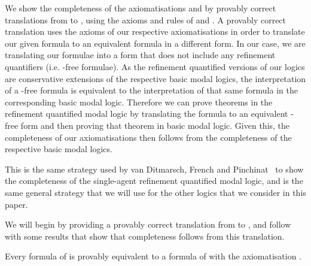 We show the completeness of the axiomatisations \axiomSiF{} and \axiomKDiF{} by
provably correct translations from \langFi{} to \langi{}, using the axioms and
rules of \axiomSiF{} and \axiomKDiF{}. A provably correct translation uses the
axioms of our respective axiomatisations in order to translate our given formula
to an equivalent formula in a different form. In our case, we are translating
our formulae into a form that does not include any refinement quantifiers (i.e.
\somerefs{}-free formulae). As the refinement quantified versions of our logics
are conservative extensions of the respective basic modal logics, the
interpretation of a \somerefs{}-free formula is equivalent to the interpretation
of that same formula in the corresponding basic modal logic. Therefore we can
prove theorems in the refinement quantified modal logic by translating the
formula to an equivalent \somerefs{}-free form and then proving that theorem in
basic modal logic. Given this, the completeness of our axiomatisations then
follows from the completeness of the respective basic modal logics.

This is the same strategy used by van Ditmarsch, French and
Pinchinat~\cite{french2010future} to show the completeness of the single-agent
refinement quantified modal logic, and is the same general strategy that we will
use for the other logics that we consider in this paper. 

We will begin by providing a provably correct translation from \langFi{} to
\langi{}, and follow with some results that show that completeness follows from
this translation.

\begin{lemma}\label{single-reduction-s5}
Every formula of \langFi{} is provably equivalent to a formula of \langi{} with
the axiomatisation \axiomSiF{}.
\end{lemma}

